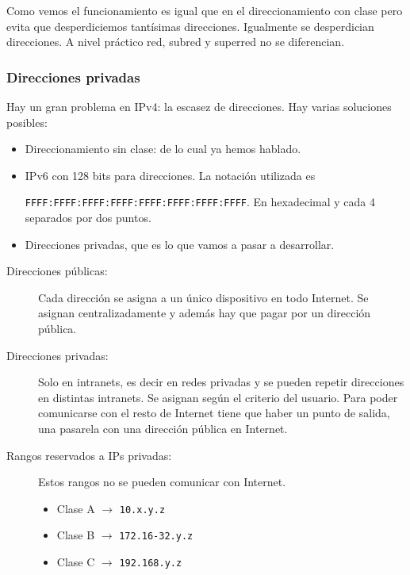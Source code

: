 Como vemos el funcionamiento es igual que en el direccionamiento con clase pero evita que desperdiciemos tantísimas direcciones. Igualmente se desperdician direcciones. A nivel práctico red, subred y superred no se diferencian. 




\subsubsection{Direcciones privadas}

Hay un gran problema en IPv4: la escasez de direcciones. Hay varias soluciones posibles: 
\begin{itemize}
    \item Direccionamiento sin clase: de lo cual ya hemos hablado.
    \item IPv6 con 128 bits para direcciones. La notación utilizada es\

        \verb|FFFF:FFFF:FFFF:FFFF:FFFF:FFFF:FFFF:FFFF|. En hexadecimal y cada 4 separados por dos puntos. 
    \item Direcciones privadas, que es lo que vamos a pasar a desarrollar.
\end{itemize}

\begin{description}
    \item [Direcciones públicas: ] Cada dirección se asigna a un único dispositivo en todo Internet. Se asignan centralizadamente y además hay que pagar por un dirección pública. 
    \item [Direcciones privadas: ] Solo en intranets, es decir en redes privadas y se pueden repetir direcciones en distintas intranets. Se asignan según el criterio del usuario. Para poder comunicarse con el resto de Internet tiene que haber un punto de salida, una pasarela con una dirección pública en Internet. 
    \item [Rangos reservados a IPs privadas:] 
    Estos rangos no se pueden comunicar con Internet.\
    \begin{itemize}
        \item Clase A $\rightarrow$ \verb|10.x.y.z|
        \item Clase B $\rightarrow$ \verb|172.16-32.y.z|
        \item Clase C $\rightarrow$ \verb|192.168.y.z|
    \end{itemize}
\end{description}

